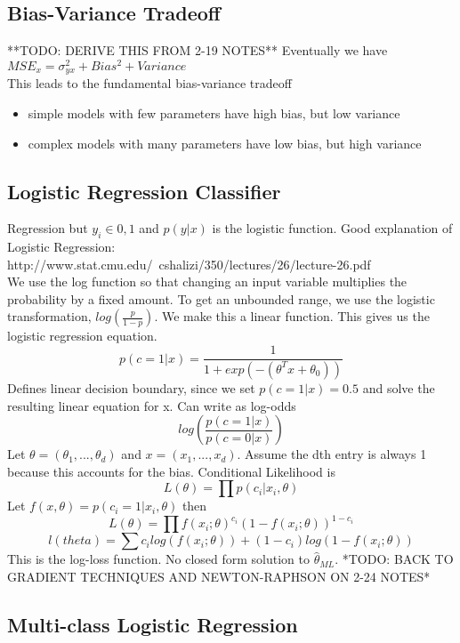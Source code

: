\documentclass[11pt,psfig]{article}
\begin{document}
\subsection*{Bias-Variance Tradeoff}

**TODO: DERIVE THIS FROM 2-19 NOTES**
Eventually we have $MSE_x = \sigma_{yx}^2 + Bias^2 + Variance$\\
This leads to the fundamental bias-variance tradeoff
\begin{itemize}
\item simple models with few parameters have high bias, but low variance
\item complex models with many parameters have low bias, but high variance
\end{itemize}

\subsection*{Logistic Regression Classifier}

Regression but $y_i \in {0,1}$ and $p(y|x)$ is the logistic function. Good explanation of Logistic Regression:\\
http://www.stat.cmu.edu/~cshalizi/350/lectures/26/lecture-26.pdf
\\
We use the log function so that changing an input variable multiplies the probability by a fixed amount. To get an unbounded range, we use the logistic transformation, $log(\frac{p}{1-p})$. We make this a linear function. This gives us the logistic regression equation. \\
\[
p(c=1|x) = \frac{1}{1 + exp(-(\theta^Tx + \theta_0))}
\]
Defines linear decision boundary, since we set $p(c=1|x)=0.5$ and solve the resulting linear equation for x. Can write as log-odds
\[
log(\frac{p(c=1|x)}{p(c=0|x)})
\]
Let $\theta = (\theta_1,...,\theta_d)$ and $x=(x_1,...,x_d)$. Assume the dth entry is always 1 because this accounts for the bias. Conditional Likelihood is
\[
L(\theta) = \prod{p(c_i|x_i,\theta)}
\]
Let $f(x,\theta) = p(c_i=1|x_i,\theta)$ then
\[
L(\theta) = \prod{f(x_i;\theta)^{c_i}(1 - f(x_i;\theta))^{1-c_i}}
\]
\[
l(theta) = \sum{c_i log(f(x_i;\theta)) + (1-c_i)log(1-f(x_i;\theta))}
\]
This is the log-loss function. No closed form solution to $\hat{\theta}_{ML}$. 
*TODO: BACK TO GRADIENT TECHNIQUES AND NEWTON-RAPHSON ON 2-24 NOTES*

\subsection*{Multi-class Logistic Regression}
\end{document}
